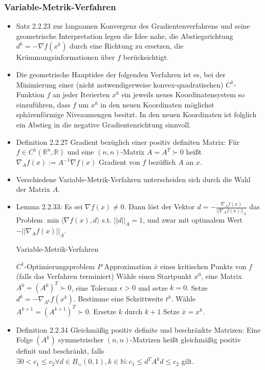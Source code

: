 \documentclass[paper=a4, fontsize=11pt]{scrartcl} %
\numberwithin{equation}{section} %
\numberwithin{figure}{section} %
\numberwithin{table}{section} %
\begin{document}
\subsubsection{Variable-Metrik-Verfahren}

\begin{itemize}
  \item Satz 2.2.23 zur langsamen Konvergenz des Gradientenverfahrens und seine geometrische Interpretation legen die Idee nahe, die Abstiegsrichtung $d^k = - \nabla f(x^k)$ durch eine Richtung zu ersetzen, die Krümmungsinformationen über $f$ berücksichtigt.
  \item Die geometrische Hauptidee der folgenden Verfahren ist es, bei der Minimierung einer (nicht notwendigerweise konvex-quadratischen) $C^1$-Funktion $f$ an jeder Iterierten $x^k$ ein jeweils neues Koordinatensystem so einzuführen, dass $f$ um $x^k$ in den neuen Koordinaten möglichst sphärenförmige Niveaumengen besitzt. In den neuen Koordinaten ist folglich ein Abstieg in die negative Gradientenrichtung sinnvoll.
  \item Definition 2.2.27 Gradient bezüglich einer positiv definiten Matrix: Für $f \in C^1(\mathbb{R}^n,\mathbb{R})$ und eine $(n,n)$-Matrix $A = A^T \succ 0$ heißt $\nabla_A f(x) := A^{-1} \nabla f(x)$ Gradient von $f$ bezüflich $A$ an $x$.
  \item Verschiedene Variable-Metrik-Verfahren unterscheiden sich durch die Wahl der Matrix $A$.
  \item Lemma 2.2.33: Es sei $\nabla f(x) \neq 0$. Dann löst der Vektor $d = - \frac{\nabla_A f(x)}{||\nabla_A f(x)||_A}$ das Problem $\min \langle \nabla f(x),d \rangle$ s.t. $||d||_A = 1$, und zwar mit optimalem Wert $-||\nabla_A f(x)||_A$.
  \begin{algorithm}
  \caption{Variable-Metrik-Verfahren}
  \begin{algorithmic}[1]
    \Require $C^1$-Optimierungsproblem $P$
    \Ensure Approximation $\bar{x}$ eines kritischen Punkts von $f$ (falls das Verfahren terminiert)
    \State Wähle einen Startpunkt $x^0$, eine Matrix $A^0 = (A^0)^T \succ 0$, eine Toleranz $\epsilon > 0$ und setze $k = 0$.
    \State Setze $d^k = - \nabla_{A^k} f(x^k)$.
    \State Bestimme eine Schrittweite $t^k$.
    \State Wähle $A^{k+1} = (A^{k+1})^T \succ 0$.
    \State Ersetze $k$ durch $k+1$
    \EndWhile
    \State Setze $\bar{x} = x^k$.
  \end{algorithmic}
  \end{algorithm}
  \item Definition 2.2.34 Gleichmäßig positiv definite und beschränkte Matrizen: Eine Folge $(A^k)$ symmetrischer $(n,n)$-Matrizen heißt gleichmäßig positiv definit und beschränkt, falls $\exists 0 < c_1 \le c_2 \forall d \in B_=(0,1), k \in \mathbb{N}: c_1 \le d^TA^kd \le c_2$ gilt.

\end{itemize}
\end{document}
